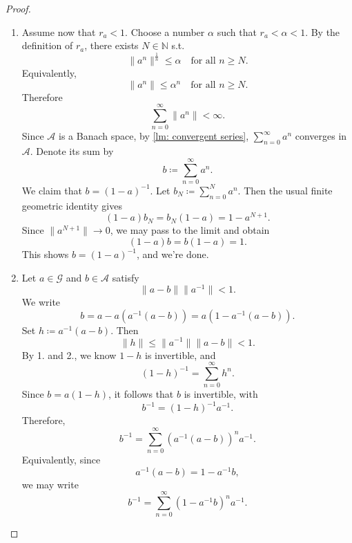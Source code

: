 \begin{proof}
\begin{enumerate}
\[        \]
        This proves the existence of \(r_a\) nad the formula 
        \[
            r_a = \inf _{n \in \mathbb{N} } \lVert a^n \rVert^{\frac{1}{n}} \le \lVert a \rVert.  
        \] 
        \item Assume now that \(r_a < 1\). Choose a number \(\alpha \) such that \(r_a < \alpha < 1\). By the definition of \(r_a\), there exists \(N \in \mathbb{N}\) s.t. 
        \[
            \lVert a^n \rVert^{\frac{1}{n}} \le \alpha \quad \text{for all } n \ge N. 
        \]
        Equivalently, 
        \[
            \lVert a^n \rVert \le \alpha ^n \quad \text{for all } n \ge N.  
        \]
        Therefore
        \[
            \sum_{n=0}^{\infty} \lVert a^n \rVert < \infty.  
        \]
        Since \(\mathcal{A} \) is a Banach space, by \autoref{lm: convergent series}, \(\sum_{n=0}^{\infty} a^n \) converges in \(\mathcal{A} \). Denote its sum by 
        \[
            b \coloneqq \sum_{n=0}^{\infty} a^n. 
        \] 
        We claim that \(b = (1 - a)^{-1}\). Let \(b_N \coloneqq \sum_{n=0}^N a^n \). Then the usual finite geometric identity gives
        \[
            (1 - a) b_N = b_N (1 - a) = 1 - a^{N + 1}.
        \]  
        Since \(\lVert a^{N + 1} \rVert \to 0 \), we may pass to the limit and obtain 
        \[
            (1 - a) b = b(1 - a) = 1.
        \] 
        This shows \(b = (1 - a)^{-1}\), and we're done. 

        \item Let \(a \in \mathcal{G} \) and \(b \in \mathcal{A} \) satisfy 
        \[
            \lVert a - b \rVert \lVert a^{-1} \rVert < 1.  
        \]
        We write 
        \[
            b = a - a \left( a^{-1} (a - b) \right) = a \left( 1 - a^{-1} (a - b) \right).  
        \]
        Set \(h \coloneqq a^{-1} (a - b)\). Then 
        \[
            \lVert h \rVert \le \lVert a^{-1} \rVert \lVert a - b \rVert < 1.   
        \] 
        By 1. and 2., we know \(1 - h\) is invertible, and 
        \[
            (1 - h)^{-1} = \sum_{n=0}^\infty h^n.
        \]  
        Since \(b = a (1 - h)\), it follows that \(b\) is invertible, with 
        \[
            b^{-1} = (1 - h)^{-1} a^{-1}.
        \]  
        Therefore,
        \begin{equation} \label{eq: 12.33}
            b^{-1} = \sum_{n=0}^{\infty} \left( a^{-1} (a - b) \right)^n a^{-1}. 
        \end{equation}
        Equivalently, since 
        \[
            a^{-1} (a - b) = 1 - a^{-1} b,
        \]
        we may write 
        \[
            b^{-1} = \sum_{n=0}^{\infty} \left( 1 - a^{-1} b \right)^n a^{-1}.  
        \]


\end{enumerate}
\end{proof}
